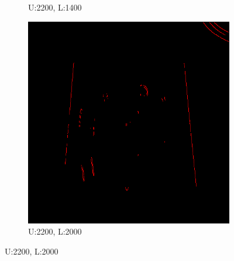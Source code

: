 \documentclass[11pt]{article}
\begin{document}
\begin{figure}[H]
\begin{subfigure}[t]{.25\textwidth}
		\caption{U:2200, L:1400}
	\end{subfigure}
\hfill
	\begin{subfigure}[t]{.25\textwidth}
		\centering
		\includegraphics[scale=0.3]{pics/normalThreshTest/Upper2200lower2000kernel5.png}
		\caption{U:2200, L:2000}
	\end{subfigure}


\end{figure}
\end{document}
